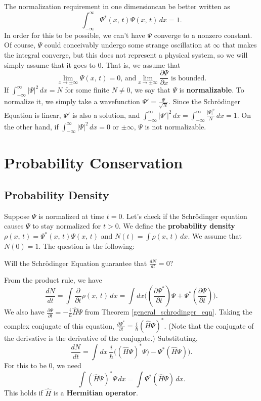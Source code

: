 The normalization requirement in one dimensioncan be better written as $$\int_{-\infty}^{\infty}\Psi^*(x,\,t)\Psi(x,\,t)\,dx=1.$$In order for this to be possible, we can't have $\Psi$ converge to a nonzero constant. Of course, $\Psi$ could conceivably undergo some strange oscillation at $\infty$ that makes the integral converge, but this does not represent a physical system, so we will simply assume that it goes to 0. That is, we assume that       $$\lim_{x\to\pm\infty}\Psi(x,\,t)=0,\,\text{and}\lim_{x\to\pm\infty}\frac{\partial \Psi}{\partial x}\text{ is bounded}.$$If $\int_{-\infty}^{\infty}|\Psi|^2\,dx=N$ for some finite $N\neq 0$, we say that $\Psi$ is \textbf{normalizable}. To normalize it, we simply take a wavefunction $\Psi'=\frac{\Psi}{\sqrt{N}}$. Since the Schrödinger Equation is linear, $\Psi'$ is also a solution, and $\int_{-\infty}^{\infty}|\Psi'|^2\,dx=\int_{-\infty}^\infty\frac{|\Psi|^2}{N}\,dx=1$. On the other hand, if $\int_{-\infty}^{\infty}|\Psi|^2\,dx=0$ or $\pm\infty$, $\Psi$ is not normalizable. 

\section{Probability Conservation}
\subsection{Probability Density}\label{prob_conserv}

Suppose $\Psi$ is normalized at time $t=0$. Let's check if the Schrödinger equation causes $\Psi$ to stay normalized for $t>0$. We define the \textbf{probability density} $\rho(x,\,t)=\Psi^*(x,\,t)\Psi(x,\,t)$ and $N(t)=\int\rho(x,\,t)\,dx$. We assume that $N(0)=1$. The question is the following: 

\begin{framedquest*}
    Will the Schrödinger Equation guarantee that $\frac{dN}{dt}=0?$
\end{framedquest*}

From the product rule, we have $$\frac{dN}{dt}=\int\frac{\partial}{\partial t}\rho(x,\,t)\,dx=\int dx\bigg((\frac{\partial\Psi^*}{\partial t})\Psi+\Psi^*(\frac{\partial\Psi}{\partial t})\bigg).$$We also have $\frac{\partial\Psi}{\partial t}=-\frac{i}{\hbar}\hat{H}\Psi$ from Theorem \ref{general_schrodinger_eqn}. Taking the complex conjugate of this equation, $\frac{\partial\Psi^*}{\partial t}=\frac{i}{\hbar}(\hat{H}\Psi)^*$. (Note that the conjugate of the derivative is the derivative of the conjugate.) Substituting, $$\frac{dN}{dt}=\int dx\,\frac{i}{\hbar}\bigg((\hat{H}\Psi)^*\Psi)-\Psi^*(\hat{H}\Psi)\bigg).$$For this to be 0, we need $$\int(\hat{H}\Psi)^*\Psi\,dx=\int\Psi^*(\hat{H}\Psi)\,dx.$$This holds if $\hat{H}$ is a \textbf{Hermitian operator}.

